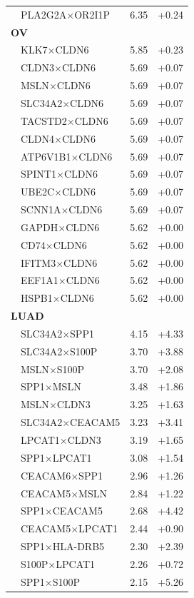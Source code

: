 \begin{longtable}{llrr}
 & PLA2G2A$\times$OR2I1P & 6.35 & +0.24\\
\multicolumn{4}{l}{\textbf{OV}}\\\hline
 & KLK7$\times$CLDN6 & 5.85 & +0.23\\
 & CLDN3$\times$CLDN6 & 5.69 & +0.07\\
 & MSLN$\times$CLDN6 & 5.69 & +0.07\\
 & SLC34A2$\times$CLDN6 & 5.69 & +0.07\\
 & TACSTD2$\times$CLDN6 & 5.69 & +0.07\\
 & CLDN4$\times$CLDN6 & 5.69 & +0.07\\
 & ATP6V1B1$\times$CLDN6 & 5.69 & +0.07\\
 & SPINT1$\times$CLDN6 & 5.69 & +0.07\\
 & UBE2C$\times$CLDN6 & 5.69 & +0.07\\
 & SCNN1A$\times$CLDN6 & 5.69 & +0.07\\
 & GAPDH$\times$CLDN6 & 5.62 & +0.00\\
 & CD74$\times$CLDN6 & 5.62 & +0.00\\
 & IFITM3$\times$CLDN6 & 5.62 & +0.00\\
 & EEF1A1$\times$CLDN6 & 5.62 & +0.00\\
 & HSPB1$\times$CLDN6 & 5.62 & +0.00\\
\multicolumn{4}{l}{\textbf{LUAD}}\\\hline
 & SLC34A2$\times$SPP1 & 4.15 & +4.33\\
 & SLC34A2$\times$S100P & 3.70 & +3.88\\
 & MSLN$\times$S100P & 3.70 & +2.08\\
 & SPP1$\times$MSLN & 3.48 & +1.86\\
 & MSLN$\times$CLDN3 & 3.25 & +1.63\\
 & SLC34A2$\times$CEACAM5 & 3.23 & +3.41\\
 & LPCAT1$\times$CLDN3 & 3.19 & +1.65\\
 & SPP1$\times$LPCAT1 & 3.08 & +1.54\\
 & CEACAM6$\times$SPP1 & 2.96 & +1.26\\
 & CEACAM5$\times$MSLN & 2.84 & +1.22\\
 & SPP1$\times$CEACAM5 & 2.68 & +4.42\\
 & CEACAM5$\times$LPCAT1 & 2.44 & +0.90\\
 & SPP1$\times$HLA-DRB5 & 2.30 & +2.39\\
 & S100P$\times$LPCAT1 & 2.26 & +0.72\\
 & SPP1$\times$S100P & 2.15 & +5.26\\

\end{longtable}
